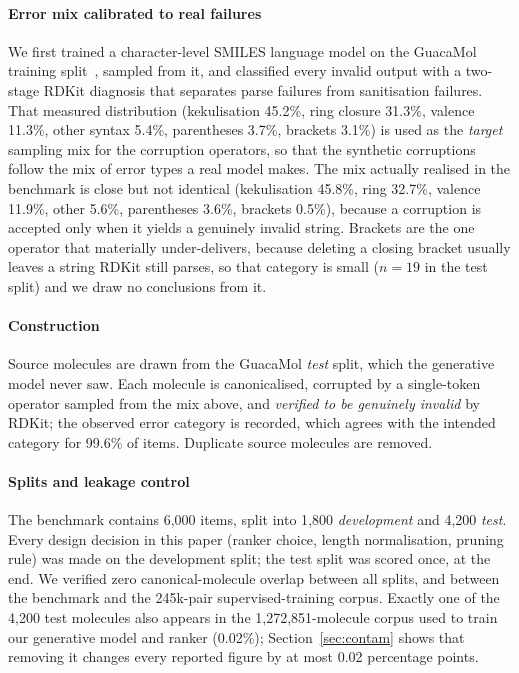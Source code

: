 \documentclass[conference]{IEEEtran}
\begin{document}
\paragraph{Error mix calibrated to real failures}
We first trained a character-level SMILES language model on the GuacaMol
training split~\citep{brown2019guacamol}, sampled from it, and classified every
invalid output with a two-stage RDKit diagnosis that separates parse failures
from sanitisation failures. That measured distribution (kekulisation 45.2\%,
ring closure 31.3\%, valence 11.3\%, other syntax 5.4\%, parentheses 3.7\%,
brackets 3.1\%) is used as the \emph{target} sampling mix for the corruption
operators, so that the synthetic corruptions follow the mix of error types a real
model makes. The mix actually realised in the benchmark is close but not identical
(kekulisation 45.8\%, ring 32.7\%, valence 11.9\%, other 5.6\%, parentheses
3.6\%, brackets 0.5\%), because a corruption is accepted only when it yields a
genuinely invalid string. Brackets are the one operator that materially
under-delivers, because deleting a closing bracket usually leaves a string
RDKit still parses, so that category is small ($n=19$ in the test split) and we
draw no conclusions from it.

\paragraph{Construction}
Source molecules are drawn from the GuacaMol \emph{test} split, which the
generative model never saw. Each molecule is canonicalised, corrupted by a
single-token operator sampled from the mix above, and \emph{verified to be
genuinely invalid} by RDKit; the observed error category is recorded, which
agrees with the intended category for 99.6\% of items. Duplicate source
molecules are removed.

\paragraph{Splits and leakage control}
The benchmark contains 6{,}000 items, split into 1{,}800 \emph{development} and
4{,}200 \emph{test}. Every design decision in this paper (ranker choice,
length normalisation, pruning rule) was made on the development split; the
test split was scored once, at the end. We verified zero canonical-molecule
overlap between all splits, and between the benchmark and the 245k-pair
supervised-training corpus. Exactly one of the 4{,}200 test molecules also
appears in the 1{,}272{,}851-molecule corpus used to train our generative model
and ranker (0.02\%); Section~\ref{sec:contam} shows that removing it changes
every reported figure by at most 0.02 percentage points.
\end{document}
